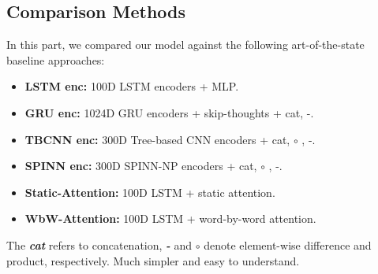 \documentclass[11pt,letterpaper]{article}
\begin{document}
\subsection{Comparison Methods}
In this part, we compared our model against the following art-of-the-state baseline approaches:
\begin{small}
\begin{itemize}
\setlength{\itemsep}{0pt}
\setlength{\parsep}{0pt}
\setlength{\parskip}{0pt}
  \item \textbf{LSTM enc:} 100D LSTM encoders + MLP. ~\cite{bowman2015large}
\item \textbf{GRU enc:} 1024D GRU encoders + skip-thoughts + cat, -. ~\cite{vendrov2015order}
  \item \textbf{TBCNN enc:} 300D Tree-based CNN encoders + cat, $\circ$ , -. ~\cite{mou2015recognizing}
  \item \textbf{SPINN enc:} 300D SPINN-NP encoders + cat, $\circ$ , -. ~\cite{bowman2016fast}
  \item \textbf{Static-Attention:} 100D LSTM + static attention. ~\cite{rocktaschel2015reasoning}
  \item \textbf{WbW-Attention:} 100D LSTM + word-by-word attention. ~\cite{rocktaschel2015reasoning}
\end{itemize}
\end{small}
The \emph{\textbf{cat}} refers to concatenation, \emph{\textbf{-}} and \textbf{$\circ$} denote element-wise difference and product, respectively.
Much simpler and easy to understand.
\end{document}
